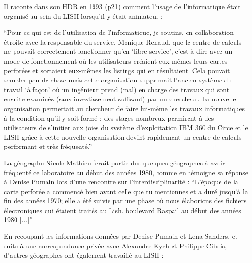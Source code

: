 Il raconte dans son HDR en 1993 (p21) comment l’usage de l’informatique était organisé au sein du LISH lorsqu’il y était animateur  :

\enquote{Pour ce qui est de l'utilisation de l'informatique, je soutins, en collaboration étroite avec la responsable du service, Monique Renaud, que le centre de calculs ne pouvait correctement fonctionner qu'en \enquote{libre-service}, c'est-à-dire avec un mode de fonctionnement où les utilisateurs créaient eux-mêmes leurs cartes perforées et sortaient eux-mêmes les listings qui en résultaient. Cela pouvait sembler peu de chose mais cette organisation supprimait l'ancien système du travail \enquote{à  façon} où un ingénieur  prend (mal) en charge des travaux  qui sont ensuite examinés (sans investissement suffisant) par un chercheur. La nouvelle organisation permettait au chercheur de faire lui-même les travaux informatiques à la condition qu'il y soit formé : des stages nombreux permirent à des utilisateurs de s'initier aux joies du système d'exploitation IBM 360 du Circe et le LISH grâce à cette nouvelle organisation devint rapidement un centre de calculs performant et très fréquenté.} \autocite{Cibois1993}

La géographe Nicole Mathieu ferait partie des quelques géographes à avoir fréquenté ce laboratoire au début des années 1980, comme en témoigne sa réponse à Denise Pumain lors d'une rencontre sur l'interdisciplinarité : \enquote{L'époque de la carte perforée a commencé bien avant celle que tu mentionnes et a duré jusqu'à la fin des années 1970; elle a été suivie par une phase où nous élaborions des fichiers électroniques qui étaient traités au Lish, boulevard Raspail au début des années 1980 [...]} \autocite[154]{Mathieu2014}

En recoupant les informations données par Denise Pumain et Lena Sanders, et suite à une correspondance privée avec Alexandre Kych et Philippe Cibois, d'autres géographes ont également travaillé au LISH :

